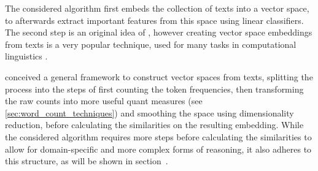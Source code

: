 The considered algorithm first embeds the collection of texts into a vector space, to afterwards extract important features from this space using linear classifiers. The second step is an original idea of \cite{Derrac2015}, however creating vector space embeddings from texts is a very popular technique, used for many tasks in computational linguistics \cite{Mikolov:Regularities,Mikolov2013a,Guo,Lowe,Turney2010}. %

 \textcite{Lowe} conceived a general framework to construct vector spaces from texts, splitting the process into the steps of first counting the token frequencies, then transforming the raw counts into more useful \gls{quant} measures (see \ref{sec:word_count_techniques}) %
  and smoothing the space using dimensionality reduction, before calculating the similarities on the resulting embedding. While the considered algorithm requires more steps before calculating the similarities to allow for domain-specific and more complex forms of reasoning, it also adheres to this structure, as will be shown in section~.




